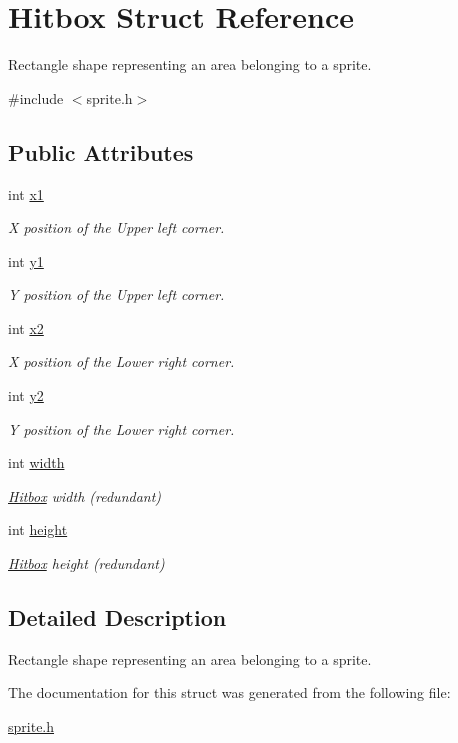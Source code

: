 \hypertarget{struct_hitbox}{}\section{Hitbox Struct Reference}
\label{struct_hitbox}


Rectangle shape representing an area belonging to a sprite.  




{\ttfamily \#include $<$sprite.\+h$>$}

\subsection*{Public Attributes}
\begin{DoxyCompactItemize}
\item 
int \mbox{\hyperlink{group__sprite_gaac205203fe002b67015db70c9c19c6a2}{x1}}
\begin{DoxyCompactList}\small\item\em X position of the Upper left corner. \end{DoxyCompactList}\item 
int \mbox{\hyperlink{group__sprite_gae4b2bb3a226633c413ecc01795f1dec9}{y1}}
\begin{DoxyCompactList}\small\item\em Y position of the Upper left corner. \end{DoxyCompactList}\item 
int \mbox{\hyperlink{group__sprite_ga5e8a3444550e7d6219148cdf421068b8}{x2}}
\begin{DoxyCompactList}\small\item\em X position of the Lower right corner. \end{DoxyCompactList}\item 
int \mbox{\hyperlink{group__sprite_ga4786580e4912ad08c39f12150bdde84f}{y2}}
\begin{DoxyCompactList}\small\item\em Y position of the Lower right corner. \end{DoxyCompactList}\item 
int \mbox{\hyperlink{group__sprite_ga1eddadd54a3cd0e831f55c322892e687}{width}}
\begin{DoxyCompactList}\small\item\em \mbox{\hyperlink{struct_hitbox}{Hitbox}} width (redundant) \end{DoxyCompactList}\item 
int \mbox{\hyperlink{group__sprite_ga4510d5b903afe522c6b1e964016d988c}{height}}
\begin{DoxyCompactList}\small\item\em \mbox{\hyperlink{struct_hitbox}{Hitbox}} height (redundant) \end{DoxyCompactList}\end{DoxyCompactItemize}


\subsection{Detailed Description}
Rectangle shape representing an area belonging to a sprite. 

The documentation for this struct was generated from the following file\+:\begin{DoxyCompactItemize}
\item 
\mbox{\hyperlink{sprite_8h}{sprite.\+h}}\end{DoxyCompactItemize}
